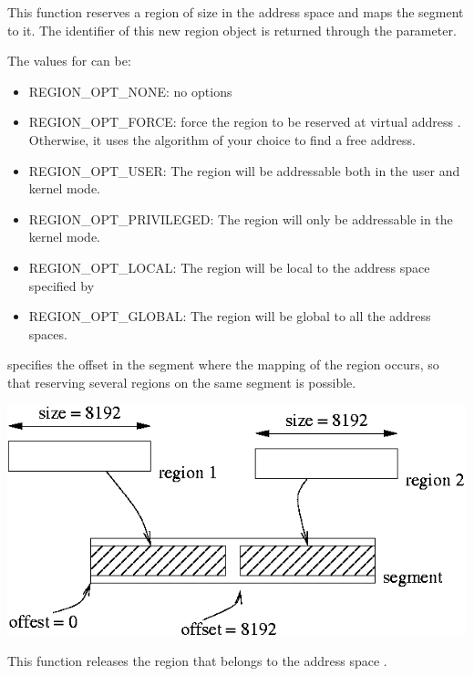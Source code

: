 {
  This function reserves a region of size  in the address space
   and maps the segment  to it. The identifier
  of this new region object is returned through the  parameter.
  
  \-
  
  The values for  can be:
  \begin{itemize}
    \item REGION\_OPT\_NONE: no options
    \item REGION\_OPT\_FORCE: force the region to be reserved at virtual
      address . Otherwise, it uses the algorithm of your choice to find a free address.
    \item REGION\_OPT\_USER: The region will be addressable both in the user
      and kernel mode.
    \item REGION\_OPT\_PRIVILEGED: The region will only be addressable in the
      kernel mode.
    \item REGION\_OPT\_LOCAL: The region will be local to the address space
      specified by 
    \item REGION\_OPT\_GLOBAL: The region will be global to all the address
      spaces.
  \end{itemize}
   specifies the offset in the segment where the mapping of the region occurs, so that reserving several regions on the same segment is possible.
  \begin{center}
    \includegraphics[width=0.4\linewidth]{figures/k1-offset}
  \end{center}

}

{
  This function releases the region  that belongs to the
  address space .
}


